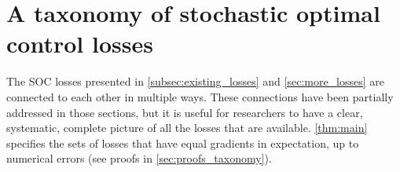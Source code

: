 \documentclass[]{fairmeta}
\begin{document}




\section{A taxonomy of stochastic optimal control losses} \label{sec:taxonomy}

The SOC losses presented in \autoref{subsec:existing_losses} and \autoref{sec:more_losses} are connected to each other in multiple ways. These connections have been partially addressed in those sections, but it is useful for researchers to have a clear, systematic, complete picture of all the losses that are available. \autoref{thm:main} specifies the sets of losses that have equal gradients in expectation, up to numerical errors (see proofs in \autoref{sec:proofs_taxonomy}).  
\end{document}
